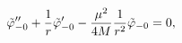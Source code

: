 \begin{equation}
{\tilde \varphi_{-0}}''
+ {1 \over r} {\tilde \varphi_{-0}}'
- {\mu^2 \over {4 M} }{1 \over r^2}{\tilde \varphi_{-0}}
=0,
\label{eq_approx_rm0}
\end{equation}

